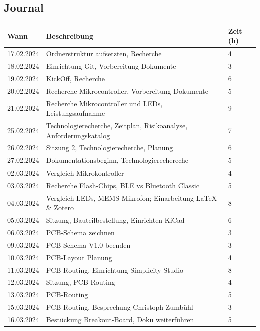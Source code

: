 \documentclass[12pt]{article}
\begin{document}
	\newpage
	\subsection*{Journal}
	\begin{table}[H]
		\centering
		\begin{tabular}{|l|p{}|l|}
			\hline
			\textbf{Wann} & \textbf{Beschreibung} & \textbf{Zeit (h)} \\ \hline
			17.02.2024 & Ordnerstruktur aufsetzten, Recherche & 4 \\ \hline
			18.02.2024 & Einrichtung Git, Vorbereitung Dokumente & 3 \\ \hline
			19.02.2024 & KickOff, Recherche & 6 \\ \hline
			20.02.2024 & Recherche Mikrocontroller, Vorbereitung Dokumente & 5 \\ \hline
			21.02.2024 & Recherche Mikrocontroller und LEDs, Leistungsaufnahme & 9 \\ \hline
			25.02.2024 & Technologierecherche, Zeitplan, Risikoanalyse, Anforderungskatalog & 7 \\ \hline
			26.02.2024 & Sitzung 2, Technologierecherche, Planung & 6 \\ \hline
			27.02.2024 & Dokumentationsbeginn, Technologierechereche & 5 \\ \hline
			02.03.2024 & Vergleich Mikrokontroller & 4 \\ \hline
			03.03.2024 & Recherche Flash-Chips, BLE vs Bluetooth Classic & 5 \\ \hline
			04.03.2024 & Vergleich LEDs, MEMS-Mikrofon; Einarbeitung LaTeX \& Zotero & 8 \\ \hline
			05.03.2024 & Sitzung, Bauteilbestellung, Einrichten KiCad & 6 \\ \hline
			06.03.2024 & PCB-Schema zeichnen & 3 \\ \hline
			09.03.2024 & PCB-Schema V1.0 beenden & 3 \\ \hline
			10.03.2024 & PCB-Layout Planung & 4 \\ \hline
			11.03.2024 & PCB-Routing, Einrichtung Simplicity Studio & 8 \\ \hline
			12.03.2024 & Sitzung, PCB-Routing & 4 \\ \hline
			13.03.2024 & PCB-Routing & 5 \\ \hline
			15.03.2024 & PCB-Routing, Besprechung Christoph Zumbühl & 3 \\ \hline
			16.03.2024 & Bestückung Breakout-Board, Doku weiterführen & 5 \\ \hline

\end{tabular}
\end{table}
\end{document}
